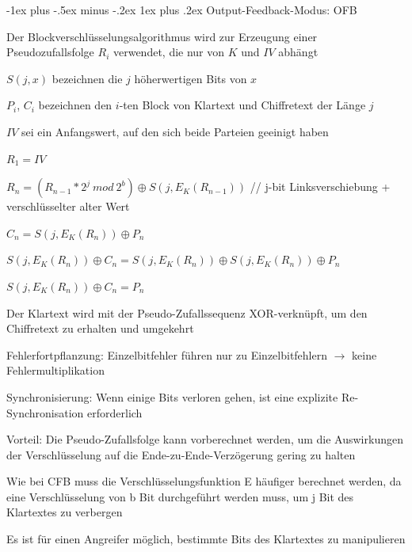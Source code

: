 \documentclass[a4paper]{article}
\makeatletter
\renewcommand{\subsubsection}{\@startsection{subsubsection}{3}{0mm}%
 {-1ex plus -.5ex minus -.2ex}%
 {1ex plus .2ex}%
 {\normalfont\small\bfseries}}
\makeatother
\begin{document}
\begin{multicols}{3}
      \subsubsection{Output-Feedback-Modus: OFB}
      \begin{itemize*}
            \item Der Blockverschlüsselungsalgorithmus wird zur Erzeugung einer Pseudozufallsfolge $R_i$ verwendet, die nur von $K$ und $IV$ abhängt
            \begin{itemize*}
                  \item $S(j, x)$ bezeichnen die $j$ höherwertigen Bits von $x$
                  \item $P_i$, $C_i$ bezeichnen den $i$-ten Block von Klartext und Chiffretext der Länge $j$
                  \item $IV$ sei ein Anfangswert, auf den sich beide Parteien geeinigt haben
                  \item $R_1 = IV$
                  \item $R_n = (R_{n-1}* 2^j\ mod\ 2^b )\oplus S(j,E_K(R_{n-1}))$ // j-bit Linksverschiebung + verschlüsselter alter Wert
                  \item $C_n = S(j,E_K(R_n))\oplus P_n$
                  \item $S(j,E_K(R_n))\oplus C_n = S(j,E_K(R_n))\oplus S(j,E_K(R_n))\oplus P_n$
                  \item $S(j,E_K(R_n))\oplus C_n = P_n$
            \end{itemize*}
            \item Der Klartext wird mit der Pseudo-Zufallssequenz XOR-verknüpft, um den Chiffretext zu erhalten und umgekehrt
            \item Fehlerfortpflanzung: Einzelbitfehler führen nur zu Einzelbitfehlern $\rightarrow$ keine Fehlermultiplikation
            \item Synchronisierung: Wenn einige Bits verloren gehen, ist eine explizite Re-Synchronisation erforderlich
            \item Vorteil: Die Pseudo-Zufallsfolge kann vorberechnet werden, um die Auswirkungen der Verschlüsselung auf die Ende-zu-Ende-Verzögerung gering zu halten
            \item Wie bei CFB muss die Verschlüsselungsfunktion E häufiger berechnet werden, da eine Verschlüsselung von b Bit durchgeführt werden muss, um j Bit des Klartextes zu verbergen
            \item Es ist für einen Angreifer möglich, bestimmte Bits des Klartextes zu manipulieren

\end{itemize*}
\end{multicols}
\end{document}
